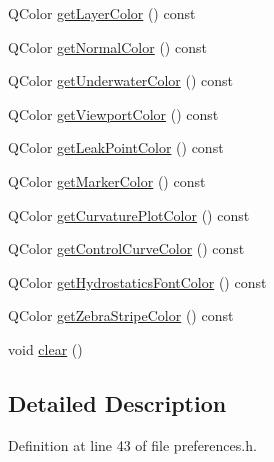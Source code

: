 \begin{DoxyCompactItemize}
\item 
Q\-Color \hyperlink{classShipCAD_1_1Preferences_abdf6967f51626cb6a7cc8596ae521643}{get\-Layer\-Color} () const 
\item 
Q\-Color \hyperlink{classShipCAD_1_1Preferences_a12e9c01bf1f039b9dc03caaf489e0947}{get\-Normal\-Color} () const 
\item 
Q\-Color \hyperlink{classShipCAD_1_1Preferences_a9ab8c8772d6986472eb0e7d1d1f23d32}{get\-Underwater\-Color} () const 
\item 
Q\-Color \hyperlink{classShipCAD_1_1Preferences_ab511ccb47da78b8fb580c16aa027b4fa}{get\-Viewport\-Color} () const 
\item 
Q\-Color \hyperlink{classShipCAD_1_1Preferences_a18e8560b2d3bf1a3889fe682220e0421}{get\-Leak\-Point\-Color} () const 
\item 
Q\-Color \hyperlink{classShipCAD_1_1Preferences_a79f08737b96acb62b538feb347e2addf}{get\-Marker\-Color} () const 
\item 
Q\-Color \hyperlink{classShipCAD_1_1Preferences_a8d8d3a62ccea95c7e538006dadd54d7d}{get\-Curvature\-Plot\-Color} () const 
\item 
Q\-Color \hyperlink{classShipCAD_1_1Preferences_a7cbff90dbc01fad7f282287ead8b9a24}{get\-Control\-Curve\-Color} () const 
\item 
Q\-Color \hyperlink{classShipCAD_1_1Preferences_a59c0004d3c77b485a6eece47b42a0d58}{get\-Hydrostatics\-Font\-Color} () const 
\item 
Q\-Color \hyperlink{classShipCAD_1_1Preferences_a7a35fe9a7fbff2b8175424317964d6c5}{get\-Zebra\-Stripe\-Color} () const 
\item 
void \hyperlink{classShipCAD_1_1Preferences_ae2139f76ba4038b4e713ca75dcb8157e}{clear} ()
\end{DoxyCompactItemize}


\subsection{Detailed Description}


Definition at line 43 of file preferences.\-h.



